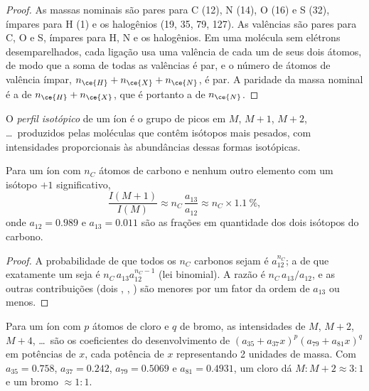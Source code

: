 \begin{proof}
As massas nominais são pares para C (12), N (14), O (16) e S (32), ímpares para H (1) e os halogênios (19,
35, 79, 127). As valências são pares para C, O e S, ímpares para H, N e os halogênios. Em uma molécula
sem elétrons desemparelhados, cada ligação usa uma valência de cada um de seus dois átomos, de modo que a
soma de todas as valências é par, e o número de átomos de valência ímpar, $n_{\ce{H}} + n_{\ce{X}} + n_{\ce{N}}$, é
par. A paridade da massa nominal é a de $n_{\ce{H}} + n_{\ce{X}}$, que é portanto a de
$n_{\ce{N}}$.
\end{proof}

\begin{definition}\label{def:b2:mass-spec-atomic:isotope-pattern}
O \emph{perfil isotópico} de um íon é o grupo de picos em $M$, $M+1$,
$M+2$, \dots\ produzidos pelas moléculas que contêm isótopos mais pesados, com intensidades
proporcionais às abundâncias dessas formas isotópicas.
\end{definition}

\begin{proposition}[O pico $M+1$]\label{prop:b2:mass-spec-atomic:m-plus-one}
Para um íon com $n_C$ átomos de carbono e nenhum outro elemento com um isótopo $+1$ significativo,
\begin{equation*}
\frac{I(M+1)}{I(M)} \approx n_C\,\frac{a_{13}}{a_{12}} \approx n_C \times 1.1~\%,
\end{equation*}
onde $a_{12} = 0.989$ e $a_{13} = 0.011$ são as frações em quantidade dos dois isótopos do carbono.
\end{proposition}

\begin{proof}
A probabilidade de que todos os $n_C$ carbonos sejam  é $a_{12}^{n_C}$; a de que exatamente um
seja  é $n_C\,a_{13}a_{12}^{n_C - 1}$ (lei binomial). A razão é $n_C\,a_{13}/a_{12}$, e as
outras contribuições (dois , , ) são menores por um fator da ordem de
$a_{13}$ ou menos.
\end{proof}

\begin{proposition}\label{prop:b2:mass-spec-atomic:halogen-patterns}
Para um íon com $p$ átomos de cloro e $q$ de bromo, as intensidades de $M$, $M+2$, $M+4$, \dots\ são
os coeficientes do desenvolvimento de $(a_{35} + a_{37}x)^p(a_{79} + a_{81}x)^q$ em potências de $x$,
cada potência de $x$ representando 2 unidades de massa. Com $a_{35} = 0.758$, $a_{37} = 0.242$, $a_{79} = 0.5069$ e
$a_{81} = 0.4931$, um cloro dá $M : M+2 \approx 3 : 1$ e um bromo $\approx 1 : 1$.
\end{proposition}

